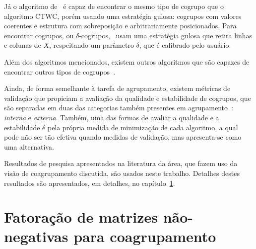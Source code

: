 \documentclass[
    12pt,                %
    oneside,            %
    a4paper,            %
    english,            %
    brazil                %
    ]{abntex2ppgsi}
\begin{document}
Já o algoritmo de~ é capaz de encontrar o mesmo tipo de cogrupo que o algoritmo CTWC, porém usando uma estratégia gulosa: cogrupos com valores coerentes e estrutura com sobreposição e arbitrariamente posicionados.
Para encontrar cogrupos, ou $\delta$-cogrupos,~ usam uma estratégia gulosa que retira linhas e colunas de $X$, respeitando um parâmetro $\delta$, que é calibrado pelo usuário.

Além dos algoritmos mencionados, existem outros algoritmos que são capazes de encontrar outros tipos de cogrupos~\cite{Franca20102,Yang2013,Hochreiter2010,Cabanes2012}.

Ainda, de forma semelhante à tarefa de agrupamento, existem métricas de validação que propiciam a avaliação da qualidade e estabilidade de cogrupos, que são separadas em duas das categorias também presentes em agrupamento~\cite{Hochreiter2010}: \textit{interna} e \textit{externa}.
Também, uma das formas de avaliar a qualidade e a estabilidade é pela própria medida de minimização de cada algoritmo, a qual pode não ser tão efetiva quando medidas de validação, mas apresenta-se como uma alternativa.

Resultados de pesquisa apresentados na literatura da área, que fazem uso da visão de coagrupamento discutida, são usados neste trabalho.
Detalhes destes resultados são apresentados, em detalhes, no capítulo~\ref{ch:fatoracao}.

\chapter{Fatoração de matrizes não-negativas para coagrupamento}
\label{ch:fatoracao}
\end{document}
